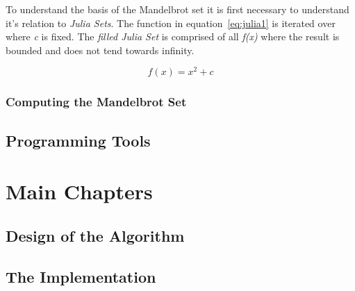 To understand the basis of the Mandelbrot set it is first necessary to understand it's relation to \textit{Julia Sets}.
The function in equation~\ref{eq:julia1} is iterated over where \textit{c} is fixed.
The \textit{filled Julia Set} is comprised of all \textit{f(x)} where the result is bounded and does not tend towards infinity.

\begin{equation}\label{eq:julia1}
f(x) = x^2 + c
\end{equation}



\subsection*{Computing the Mandelbrot Set}


\section{Programming Tools}

\chapter{Main Chapters}
\section{Design of the Algorithm}

\section{The Implementation}

